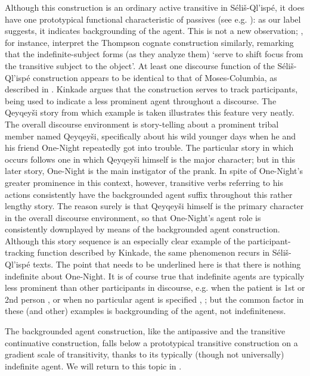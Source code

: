 \documentclass[output=paper,colorlinks,citecolor=brown]{langscibook}
\begin{document}
Although this construction is an ordinary active transitive in
S\'eli\v{s}-Ql'isp\'e, it does have one prototypical functional
characteristic of passives (see e.g. \citealt{Shibatani:1985}): as our label
suggests, it indicates backgrounding of the agent.  This is not a new
observation; \citet[58]{Thompson&Thompson:1992}, for instance, interpret
the Thompson cognate construction similarly, remarking that the
indefinite-subject forms (as they analyze them) `serve to shift focus
from the transitive subject to the object'.  At least one discourse
function of the S\'eli\v{s}-Ql'isp\'e construction appears to be
identical to that of Moses-Columbia, as described in .
Kinkade argues that the construction serves to track participants,
being used to indicate a less prominent agent throughout a discourse.
The Qeyqey\v{s}i story from which example   is taken illustrates this
feature very neatly.  The overall discourse environment is
story-telling about a prominent tribal member named Qeyqey\v{s}i,
specifically about his wild younger days when he and his friend
One-Night repeatedly got into trouble.  The particular story in which
 occurs follows one in which Qeyqey\v{s}i himself is the major
character; but in this later story, One-Night is the main instigator
of the prank.  In spite of One-Night's greater prominence in this
context, however, transitive verbs referring to his actions
consistently have the backgrounded agent suffix throughout this rather
lengthy story.  The reason surely is that Qeyqey\v{s}i himself is the
primary character in the overall discourse environment, so that
One-Night's agent role is consistently downplayed by means of the
backgrounded agent construction.  Although this story sequence is an
especially clear example of the participant-tracking function
described by Kinkade, the same phenomenon recurs in
S\'eli\v{s}-Ql'isp\'e texts.  The point that needs to be underlined
here is that there is nothing indefinite about One-Night.  It is of
course true that indefinite agents are typically less prominent than
other participants in discourse, e.g.  when the patient is 1st or 2nd
person ,  or when no particular agent is specified , ; but
the common factor in these (and other) examples is backgrounding of
the agent, not indefiniteness.

The backgrounded agent construction, like the antipassive and the
transitive continuative construction, falls below a prototypical
transitive construction on a gradient scale of transitivity, thanks to
its typically (though not universally) indefinite agent.  We will
return to this topic in .
\end{document}
